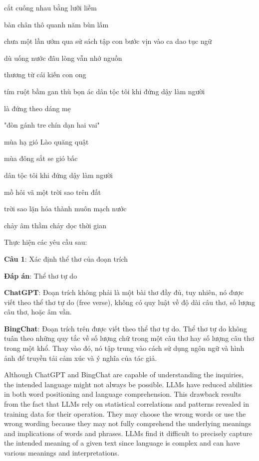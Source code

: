 \documentclass{article}
\begin{document}
{\begin{mdframed}[linewidth=1pt,linecolor=red]
\begin{multicols}{2}
			cắt cuống nhau bằng lưỡi liềm 
			
			bàn chân thô quanh năm bùn lấm 
			
			chưa một lần ướm qua sử sách
			tập con bước vịn vào ca dao tục ngữ 
			
			dù uống nước đâu lòng vẫn nhớ nguồn 
			
			thương từ cái kiến con ong 
			
			tím ruột bầm gan thù bọn ác 
			dân tộc tôi khi đứng dậy làm người 
			
			là đứng theo dáng mẹ 
			
			"đòn gánh tre chín dạn hai vai"
			
			mùa hạ gió Lào quăng quật
			
			mùa đông sắt se gió bấc 
			
			dân tộc tôi khi đứng dậy làm người 
			
			mồ hôi vã một trời sao trên đất 
			
			trời sao lặn hóa thành muôn mạch nước 
			
			chảy âm thầm chảy dọc thời gian	 
			
\end{multicols}
		Thực hiện các yêu cầu sau: 
		
		\textbf{Câu 1}: Xác định thể thơ của đoạn trích 
		
		\textbf{Đáp án}: Thể thơ tự do 
		
		\textbf{ChatGPT}: Đoạn trích không phải là một bài thơ đầy đủ, tuy nhiên, nó được viết theo thể thơ tự do (free verse), không có quy luật về độ dài câu thơ, số lượng câu thơ, hoặc âm vần. 
		
		\textbf{BingChat}: Đoạn trích trên được viết theo thể thơ tự do. Thể thơ tự do không tuân theo những quy tắc về số lượng chữ trong một câu thơ hay số lượng câu thơ trong một khổ. Thay vào đó, nó tập trung vào cách sử dụng ngôn ngữ và hình ảnh để truyền tải cảm xúc và ý nghĩa của tác giả.
		
	\end{mdframed}
	
	Although ChatGPT and BingChat are capable of understanding the inquiries, the intended language might not always be possible. LLMs have reduced abilities in both word positioning and language comprehension. This drawback results from the fact that LLMs rely on statistical correlations and patterns revealed in training data for their operation. They may choose the wrong words or use the wrong wording because they may not fully comprehend the underlying meanings and implications of words and phrases. LLMs find it difficult to precisely capture the intended meaning of a given text since language is complex and can have various meanings and interpretations.
	
}
\end{document}
